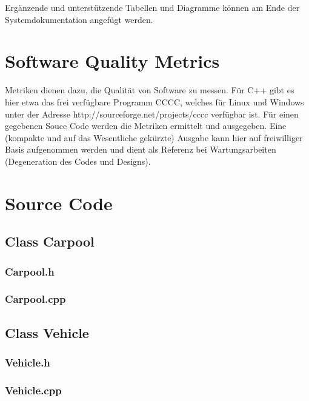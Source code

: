 Ergänzende und unterstützende Tabellen und Diagramme können am Ende der Systemdokumentation angefügt werden.


\section{Software Quality Metrics}

Metriken dienen dazu, die Qualität von Software zu messen. Für C++ gibt es hier
etwa das frei verfügbare Programm CCCC, welches für Linux und Windows unter
der Adresse http://sourceforge.net/projects/cccc verfügbar ist. Für einen gegebenen
Souce Code werden die Metriken ermittelt und ausgegeben. Eine (kompakte und auf
das Wesentliche gekürzte) Ausgabe kann hier auf freiwilliger Basis aufgenommen
werden und dient als Referenz bei Wartungsarbeiten (Degeneration des Codes und
Designs).
\section{Source Code}

\subsection{Class Carpool}
\subsubsection{Carpool.h}
\subsubsection{Carpool.cpp}

\subsection{Class Vehicle}
\subsubsection{Vehicle.h}
\subsubsection{Vehicle.cpp}


